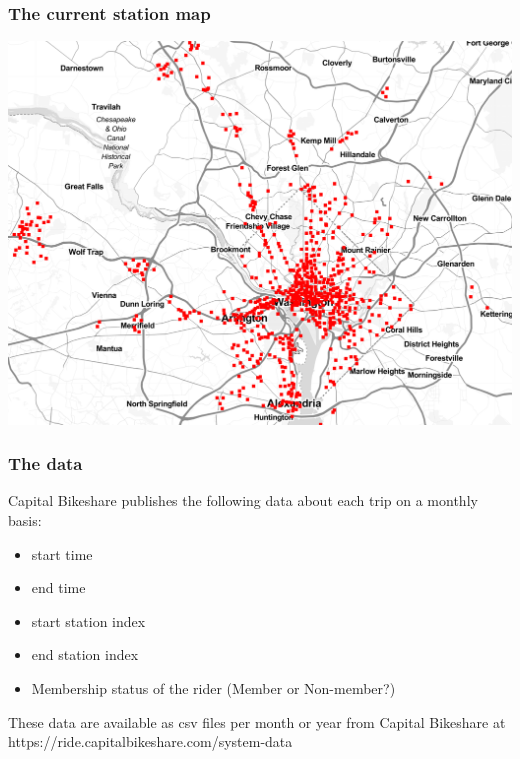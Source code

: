 \documentclass{beamer}
\begin{document}
\begin{frame}
\begin{columns}
    \end{columns}
\end{frame}

\begin{frame}
    \frametitle{The current station map}
    \includegraphics[width=\textwidth]{./cabi_stations.png}
\end{frame}
\begin{frame}
    \frametitle{The data}

    Capital Bikeshare publishes the following data about each trip on a monthly basis:

    \begin{itemize}
        \item start time
        \item end time
        \item start station index
        \item end station index
        \item Membership status of the rider (Member or Non-member?)
    \end{itemize}

    These data are available as csv files per month or year from Capital Bikeshare at https://ride.capitalbikeshare.com/system-data
\end{frame}
\end{document}
